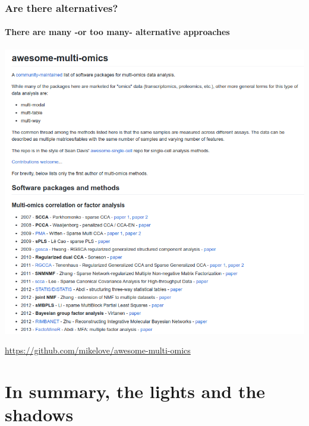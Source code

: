 \documentclass{beamer}
\begin{document}
\begin{frame}
	\frametitle{Are there alternatives?}
	\framesubtitle{There are many -or too many- alternative approaches}
	\begin{center}
		\includegraphics[height=0.7\textheight]{images/awesomeMultiOmics.png}
	\end{center}
    {\center \large \url{https://github.com/mikelove/awesome-multi-omics}}
\end{frame}



\section{In summary, the lights and the shadows}
\end{document}
